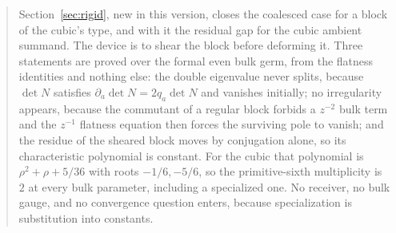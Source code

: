 \documentclass[11pt]{article}
\theoremstyle{definition}
\theoremstyle{remark}
\begin{document}
\begin{abstract}
Section~\ref{sec:rigid}, new in this version, closes the coalesced case for a
block of the cubic's type, and with it the residual gap for the cubic ambient
summand. The device is to shear the block before deforming it. Three statements
are proved over the formal even bulk germ, from the flatness identities and
nothing else: the double eigenvalue never splits, because $\det N$ satisfies
$\partial_a\det N=2q_a\det N$ and vanishes initially; no irregularity appears,
because the commutant of a regular block forbids a $z^{-2}$ bulk term and the
$z^{-1}$ flatness equation then forces the surviving pole to vanish; and the
residue of the sheared block moves by conjugation alone, so its characteristic
polynomial is constant. For the cubic that polynomial is $\rho^2+\rho+5/36$
with roots $-1/6,-5/6$, so the primitive-sixth multiplicity is $2$ at every bulk
parameter, including a specialized one. No receiver, no bulk gauge, and no
convergence question enters, because specialization is substitution into
constants.


\end{abstract}
\end{document}
